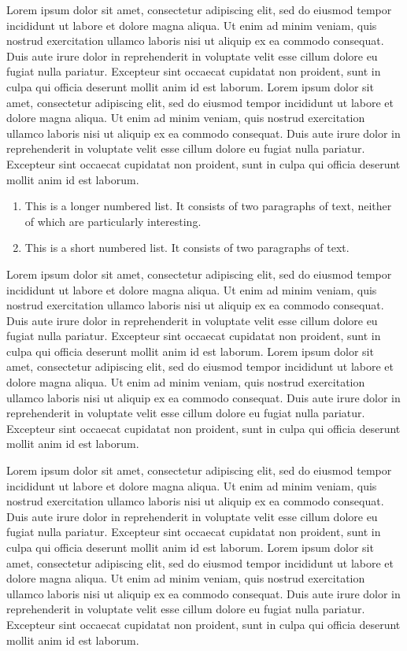 \documentclass[english]{sbcreviews-2025}%
\begin{document}
Lorem ipsum dolor sit amet, consectetur adipiscing elit, sed do eiusmod tempor incididunt ut labore et dolore magna aliqua. Ut enim ad minim veniam, quis nostrud exercitation ullamco laboris nisi ut aliquip ex ea commodo consequat. Duis aute irure dolor in reprehenderit in voluptate velit esse cillum dolore eu fugiat nulla pariatur. Excepteur sint occaecat cupidatat non proident, sunt in culpa qui officia deserunt mollit anim id est laborum. Lorem ipsum dolor sit amet, consectetur adipiscing elit, sed do eiusmod tempor incididunt ut labore et dolore magna aliqua. Ut enim ad minim veniam, quis nostrud exercitation ullamco laboris nisi ut aliquip ex ea commodo consequat. Duis aute irure dolor in reprehenderit in voluptate velit esse cillum dolore eu fugiat nulla pariatur. Excepteur sint occaecat cupidatat non proident, sunt in culpa qui officia deserunt mollit anim id est laborum.

\begin{enumerate}%
\item This is a longer numbered list. It consists of two paragraphs of text, neither of which are particularly interesting.
\item This is a short numbered list. It consists of two paragraphs of text.
\end{enumerate}

Lorem ipsum dolor sit amet, consectetur adipiscing elit, sed do eiusmod tempor incididunt ut labore et dolore magna aliqua. Ut enim ad minim veniam, quis nostrud exercitation ullamco laboris nisi ut aliquip ex ea commodo consequat. Duis aute irure dolor in reprehenderit in voluptate velit esse cillum dolore eu fugiat nulla pariatur. Excepteur sint occaecat cupidatat non proident, sunt in culpa qui officia deserunt mollit anim id est laborum. Lorem ipsum dolor sit amet, consectetur adipiscing elit, sed do eiusmod tempor incididunt ut labore et dolore magna aliqua. Ut enim ad minim veniam, quis nostrud exercitation ullamco laboris nisi ut aliquip ex ea commodo consequat. Duis aute irure dolor in reprehenderit in voluptate velit esse cillum dolore eu fugiat nulla pariatur. Excepteur sint occaecat cupidatat non proident, sunt in culpa qui officia deserunt mollit anim id est laborum.

Lorem ipsum dolor sit amet, consectetur adipiscing elit, sed do eiusmod tempor incididunt ut labore et dolore magna aliqua. Ut enim ad minim veniam, quis nostrud exercitation ullamco laboris nisi ut aliquip ex ea commodo consequat. Duis aute irure dolor in reprehenderit in voluptate velit esse cillum dolore eu fugiat nulla pariatur. Excepteur sint occaecat cupidatat non proident, sunt in culpa qui officia deserunt mollit anim id est laborum. Lorem ipsum dolor sit amet, consectetur adipiscing elit, sed do eiusmod tempor incididunt ut labore et dolore magna aliqua. Ut enim ad minim veniam, quis nostrud exercitation ullamco laboris nisi ut aliquip ex ea commodo consequat. Duis aute irure dolor in reprehenderit in voluptate velit esse cillum dolore eu fugiat nulla pariatur. Excepteur sint occaecat cupidatat non proident, sunt in culpa qui officia deserunt mollit anim id est laborum.
\end{document}
